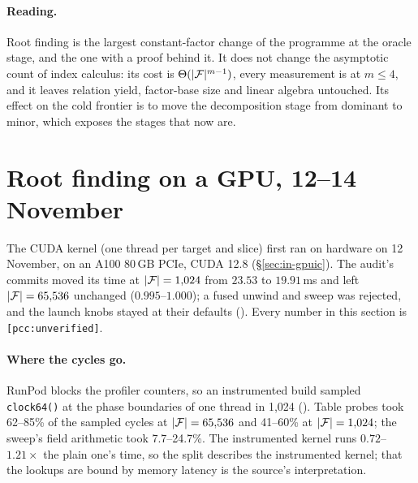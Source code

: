 \paragraph{Reading.} Root finding is the largest constant-factor change
of the programme at the oracle stage, and the one with a proof behind it.
It does not change the asymptotic count of index calculus: its cost is
$\Theta(\lvert \mathcal{F} \rvert^{m-1})$, every measurement is at $m\le4$, and it leaves
relation yield, factor-base size and linear algebra untouched. Its effect
on the cold frontier is to move the decomposition stage from dominant to
minor, which exposes the stages that now are.

\section{Root finding on a GPU, 12--14 November}\label{sec:rf-gpu}

The CUDA kernel (one thread per target and slice) first ran on hardware on
12 November, on an A100 80\,GB PCIe, CUDA 12.8 (\S\ref{sec:in-gpuic}). The
audit's commits moved its time at $\lvert \mathcal{F} \rvert=1{,}024$ from $23.53$ to
$19.91$\,ms and left $\lvert \mathcal{F} \rvert=65{,}536$ unchanged ($0.995$--$1.000$); a fused
unwind and sweep was rejected, and the launch knobs stayed at their
defaults (). Every number
in this section is \texttt{[pcc:unverified]}.

\paragraph{Where the cycles go.} RunPod blocks the profiler counters, so
an instrumented build sampled \texttt{clock64()} at the phase boundaries of
one thread in 1{,}024 ().
Table probes took 62--85\% of the sampled cycles at $\lvert \mathcal{F} \rvert=65{,}536$ and
41--60\% at $\lvert \mathcal{F} \rvert=1{,}024$; the sweep's field arithmetic took 7.7--24.7\%. The
instrumented kernel runs $0.72$--$1.21\times$ the plain one's time, so the
split describes the instrumented kernel; that the lookups are bound by
memory latency is the source's interpretation.

